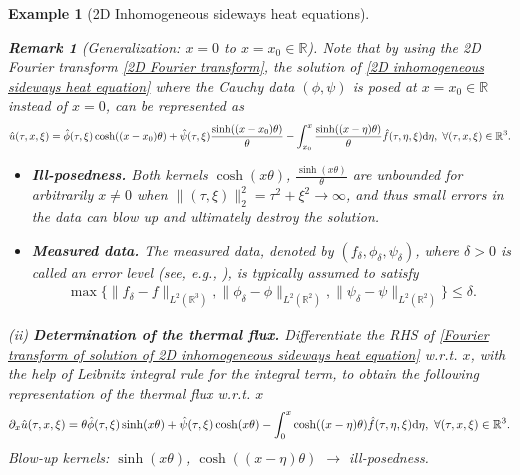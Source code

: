 \documentclass[oneside]{article}
\numberwithin{equation}{section}
\newtheorem{remark}{Remark}[section]
\newtheorem{example}{Example}[section]
\begin{document}
\begin{example}[2D Inhomogeneous sideways heat equations]
    \begin{remark}[Generalization: $x = 0$ to $x = x_0\in\mathbb{R}$]
        Note that by using the 2D Fourier transform \eqref{2D Fourier transform}, the solution of \eqref{2D inhomogeneous sideways heat equation} where the Cauchy data $(\phi,\psi)$ is posed at $x = x_0\in\mathbb{R}$ instead of $x = 0$, can be represented as
        \begin{align*}
            \hat{u}(\tau,x,\xi) = \hat{\phi}(\tau,\xi)\cosh((x - x_0)\theta) + \hat{\psi}(\tau,\xi)\frac{\sinh((x - x_0)\theta)}{\theta} - \int_{x_0}^x \frac{\sinh((x - \eta)\theta)}{\theta}\hat{f}(\tau,\eta,\xi){\rm d}\eta,\ \forall(\tau,x,\xi)\in\mathbb{R}^3.
        \end{align*}
    \end{remark}
    \begin{itemize}
        \item \textbf{Ill-posedness.} Both kernels $\cosh(x\theta)$, $\frac{\sinh(x\theta)}{\theta}$ are unbounded for arbitrarily $x\ne 0$ when $\|(\tau,\xi)\|_2^2 = \tau^2 + \xi^2\to\infty$, and thus small errors in the data can blow up and ultimately destroy the solution.
        \item \textbf{Measured data.} The measured data, denoted by $(f_\delta,\phi_\delta,\psi_\delta)$, where $\delta > 0$ is called an \emph{error level} (see, e.g., \cite{Ito_Jin2015, Kirsch2021}), is typically assumed to satisfy
        \begin{align}
            \label{noise boundedness}
            \tag{noise}
            \max\{\|f_\delta - f\|_{L^2(\mathbb{R}^3)},\|\phi_\delta - \phi\|_{L^2(\mathbb{R}^2)},\|\psi_\delta - \psi\|_{L^2(\mathbb{R}^2)}\}\le\delta.
        \end{align}
    \end{itemize}
    (ii) \textbf{Determination of the thermal flux.} Differentiate the RHS of \eqref{Fourier transform of solution of 2D inhomogeneous sideways heat equation} w.r.t. $x$, with the help of Leibnitz integral rule for the integral term, to obtain the following representation of the thermal flux w.r.t. $x$
    \begin{align*}
        \partial_x\hat{u}(\tau,x,\xi) = \theta\hat{\phi}(\tau,\xi)\sinh(x\theta) + \hat{\psi}(\tau,\xi)\cosh(x\theta) - \int_0^x \cosh((x - \eta)\theta)\hat{f}(\tau,\eta,\xi){\rm d}\eta,\ \forall(\tau,x,\xi)\in\mathbb{R}^3.
    \end{align*}
    Blow-up kernels: $\sinh(x\theta)$, $\cosh((x - \eta)\theta)$ $\to$ ill-posedness.
    

\end{example}
\end{document}
